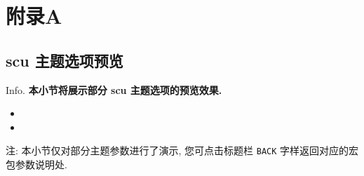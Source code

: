 \section{附录A}
\subsection{scu 主题选项预览}
\begin{frame}{Info.}
	\textbf{本小节将展示部分 scu 主题选项的预览效果.}
	\begin{multicols}{2}
		\begin{itemize}
			\item {}
			\item {}
		\end{itemize}
	\end{multicols}
	注: 本小节仅对部分主题参数进行了演示, 您可点击标题栏 \texttt{BACK} 字样返回对应的宏包参数说明处.\par
	\mycopyright
\end{frame}

